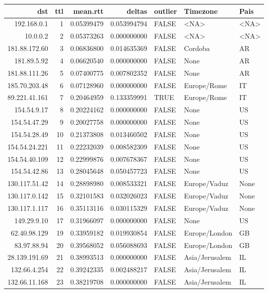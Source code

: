 \documentclass[11pt]{article}
\author{nsm}
\date{\today}
\title{}
\begin{document}
\tableofcontents

\begin{center}
\begin{tabular}{rrrrlll}
dst & ttl & mean.rtt & deltas & outlier & Timezone & Pais\\
\hline
192.168.0.1 & 1 & 0.05399479 & 0.053994794 & FALSE & <NA> & <NA>\\
10.0.0.2 & 2 & 0.05373263 & 0.000000000 & FALSE & <NA> & <NA>\\
181.88.172.60 & 3 & 0.06836800 & 0.014635369 & FALSE & Cordoba & AR\\
181.89.5.92 & 4 & 0.06620540 & 0.000000000 & FALSE & None & AR\\
181.88.111.26 & 5 & 0.07400775 & 0.007802352 & FALSE & None & AR\\
185.70.203.48 & 6 & 0.07128960 & 0.000000000 & FALSE & Europe/Rome & IT\\
89.221.41.161 & 7 & 0.20464959 & 0.133359991 & TRUE & Europe/Rome & IT\\
154.54.9.17 & 8 & 0.20224162 & 0.000000000 & FALSE & None & US\\
154.54.47.29 & 9 & 0.20027758 & 0.000000000 & FALSE & None & US\\
154.54.28.49 & 10 & 0.21373808 & 0.013460502 & FALSE & None & US\\
154.54.24.221 & 11 & 0.22232039 & 0.008582309 & FALSE & None & US\\
154.54.40.109 & 12 & 0.22999876 & 0.007678367 & FALSE & None & US\\
154.54.42.86 & 13 & 0.28045648 & 0.050457723 & FALSE & None & US\\
130.117.51.42 & 14 & 0.28898980 & 0.008533321 & FALSE & Europe/Vaduz & None\\
130.117.0.142 & 15 & 0.32101583 & 0.032026023 & FALSE & Europe/Vaduz & None\\
130.117.1.117 & 16 & 0.35113116 & 0.030115329 & FALSE & Europe/Vaduz & None\\
149.29.9.10 & 17 & 0.31966097 & 0.000000000 & FALSE & None & US\\
62.40.98.129 & 19 & 0.33959182 & 0.019930854 & FALSE & Europe/London & GB\\
83.97.88.94 & 20 & 0.39568052 & 0.056088693 & FALSE & Europe/London & GB\\
28.139.191.69 & 21 & 0.38993513 & 0.000000000 & FALSE & Asia/Jerusalem & IL\\
132.66.4.254 & 22 & 0.39242335 & 0.002488217 & FALSE & Asia/Jerusalem & IL\\
132.66.11.168 & 23 & 0.38219708 & 0.000000000 & FALSE & Asia/Jerusalem & IL\\
\end{tabular}
\end{center}
\end{document}
